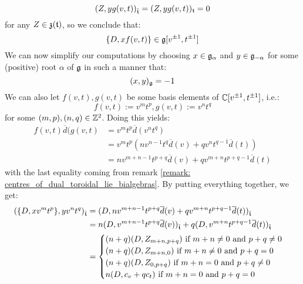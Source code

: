 \begin{remark}
                    $$(Z, y g(v, t))_{\hat{\mathfrak{t}}} = (Z, y g(v, t))_{\mathfrak{t}} = 0$$
                for any $Z \in \mathfrak{z}(\mathfrak{t})$, so we conclude that:
                    $$\{D, x f(v, t)\} \in \mathfrak{g}[v^{\pm 1}, t^{\pm 1}]$$
                We can now simplify our computations by choosing $x \in \mathfrak{g}_{\alpha}$ and $y \in \mathfrak{g}_{-\alpha}$ for some (positive) root $\alpha$ of $\mathfrak{g}$ in such a manner that:
                    $$(x, y)_{\mathfrak{g}} = -1$$
                We can also let $f(v, t), g(v, t)$ be some basis elements of $\mathbb{C}[v^{\pm 1}, t^{\pm 1}]$, i.e.:
                    $$f(v, t) := v^m t^p, g(v, t) := v^n t^q$$
                for some $(m, p), (n, q) \in \mathbb{Z}^2$. Doing this yields:
                    $$
                        \begin{aligned}
                            f(v, t) \overline{d}( g(v, t) & = v^m t^p \overline{d}( v^n t^q )
                            \\
                            & = v^m t^p ( n v^{n - 1} t^q \overline{d}(v) + q v^n t^{q - 1} \overline{d}(t) )
                            \\
                            & = n v^{m + n - 1} t^{p + q} \overline{d}(v) + q v^{m + n} t^{p + q - 1} \overline{d}(t)
                        \end{aligned}
                    $$
                with the last equality coming from remark \ref{remark: centres_of_dual_toroidal_lie_bialgebras}. By putting everything together, we get:
                    $$
                        \begin{aligned}
                            ( \{D, x v^m t^p\}, y v^n t^q )_{\hat{\mathfrak{t}}} & = ( D, n v^{m + n - 1} t^{p + q} \overline{d}(v) + q v^{m + n} t^{p + q - 1} \overline{d}(t) )_{\hat{\mathfrak{t}}}
                            \\
                            & = n ( D, v^{m + n - 1} t^{p + q} \overline{d}(v) )_{\hat{\mathfrak{t}}} + q ( D, v^{m + n} t^{p + q - 1} \overline{d}(t) )_{\hat{\mathfrak{t}}}
                            \\
                            & =
                            \begin{cases}
                                \text{$(n + q) (D, Z_{m + n, p + q})$ if $m + n \not = 0$ and $p + q \not = 0$}
                                \\
                                \text{$(n + q) (D, Z_{m + n, 0})$ if $m + n \not = 0$ and $p + q = 0$}
                                \\
                                \text{$(n + q) (D, Z_{0, p + q})$ if $m + n = 0$ and $p + q \not = 0$}
                                \\
                                \text{$n (D, c_v + q c_t)$ if $m + n = 0$ and $p + q = 0$}
                            \end{cases}
                        \end{aligned}
                    $$


\end{remark}
